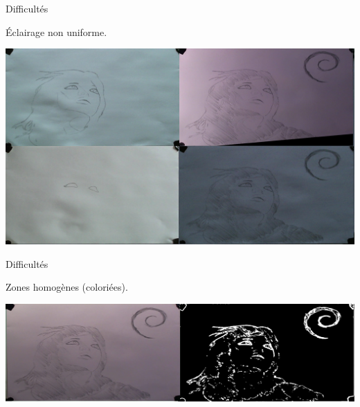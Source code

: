 \documentclass[t,14pt]{beamer}
\begin{document}
\vspace{5mm}
\begin{frame}{Difficultés}
\vspace{5mm}
\begin{block}{}
Éclairage non uniforme.
\end{block}
\begin{center}
\includegraphics[scale=0.20]{images/diffEclairage.png}
\end{center}
\end{frame}

\begin{frame}{Difficultés}
\vspace{5mm}
\begin{block}{}
Zones homogènes (coloriées).
\end{block}
\begin{center}
\includegraphics[width=\textwidth]{images/sobel.png}
\end{center}

\end{frame}
\end{document}
